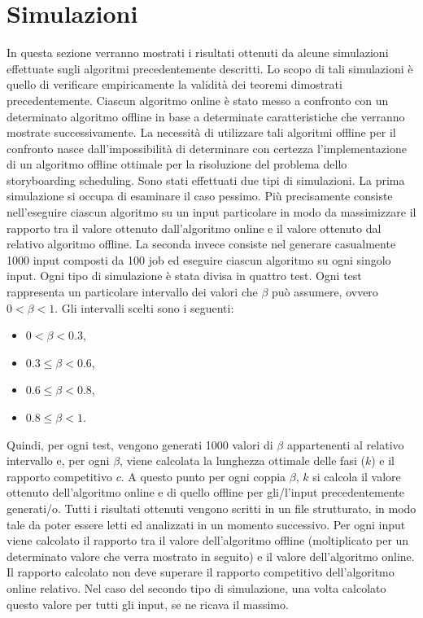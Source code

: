 \documentclass[twoside,openany,titlepage,fleqn,
	headinclude,12pt,a4paper,BCOR5mm,footinclude]{scrbook}
\begin{document}
\chapter{Simulazioni}
In questa sezione verranno mostrati i risultati ottenuti da alcune simulazioni effettuate sugli algoritmi precedentemente descritti. Lo scopo di tali simulazioni è quello di verificare empiricamente la validità dei teoremi dimostrati precedentemente. Ciascun algoritmo online è stato messo a confronto con un determinato algoritmo offline in base a determinate caratteristiche che verranno mostrate successivamente. La necessità di utilizzare tali algoritmi offline per il confronto nasce dall’impossibilità di determinare con certezza l’implementazione di un algoritmo offline ottimale per la risoluzione del problema dello storyboarding scheduling. Sono stati effettuati due tipi di simulazioni. La prima simulazione si occupa di esaminare il caso pessimo. Più precisamente consiste nell'eseguire ciascun algoritmo su un input particolare in modo da massimizzare il rapporto tra il valore ottenuto dall'algoritmo online e il valore ottenuto dal relativo algoritmo offline. La seconda invece consiste nel generare casualmente 1000 input composti da 100 job ed eseguire ciascun algoritmo su ogni singolo input. Ogni tipo di simulazione è stata divisa in quattro test. Ogni test rappresenta un particolare intervallo dei valori che $\beta$ può assumere, ovvero $0 < \beta < 1$. Gli intervalli scelti sono i seguenti:
\begin{itemize}
\item{$0 < \beta < 0.3$,}
\item{$0.3 \leq \beta < 0.6$,}
\item{$0.6 \leq \beta < 0.8$,}
\item{$0.8 \leq \beta < 1$.}
\end{itemize}
Quindi, per ogni test, vengono generati 1000 valori di $\beta$ appartenenti al relativo intervallo e, per ogni $\beta$, viene calcolata la lunghezza ottimale delle fasi ($k$) e il rapporto competitivo $c$. A questo punto per ogni coppia $\beta$, $k$ si calcola il valore ottenuto dell'algoritmo online e di quello offline per gli/l'input precedentemente generati/o. Tutti i risultati ottenuti vengono scritti in un file strutturato, in modo tale da poter essere letti ed analizzati in un momento successivo. Per ogni input viene calcolato il rapporto tra il valore dell'algoritmo offline (moltiplicato per un determinato valore che verra mostrato in seguito) e il valore dell'algoritmo online. Il rapporto calcolato non deve superare il rapporto competitivo dell'algoritmo online relativo. Nel caso del secondo tipo di simulazione, una volta calcolato questo valore per tutti gli input, se ne ricava il massimo. 
\end{document}
